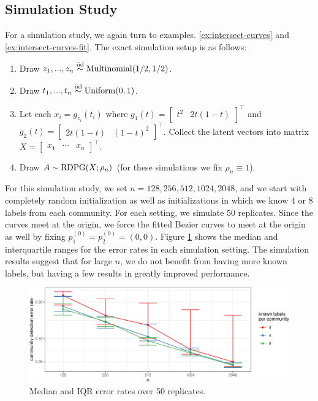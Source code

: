 \documentclass[
  11pt,
]{article}
\providecommand{\tightlist}{%
  \setlength{\itemsep}{0pt}\setlength{\parskip}{0pt}}
\theoremstyle{definition}
\theoremstyle{definition}
\theoremstyle{definition}
\theoremstyle{definition}
\theoremstyle{remark}
\begin{document}
\hypertarget{simulation-study-1}{%
\subsection{Simulation Study}\label{simulation-study-1}}

For a simulation study, we again turn to examples. \ref{ex:intersect-curves} and \ref{ex:intersect-curves-fit}.
The exact simulation setup is as follows:

\begin{enumerate}
\def\labelenumi{\arabic{enumi}.}
\tightlist
\item
  Draw \(z_1, ..., z_n \stackrel{\mathrm{iid}}{\sim} \mathrm{Multinomial}(1/2, 1/2)\).
\item
  Draw \(t_1, ..., t_n \stackrel{\mathrm{iid}}{\sim} \mathrm{Uniform}(0, 1)\).
\item
  Let each \(x_i = g_{z_i}(t_i)\) where \(g_1(t) = \begin{bmatrix} t^2 & 2 t (1-t) \end{bmatrix}^\top\) and \(g_2(t) = \begin{bmatrix} 2 t (1-t) & (1-t)^2 \end{bmatrix}^\top\).
  Collect the latent vectors into matrix \(X = \begin{bmatrix} x_1 & \cdots & x_n \end{bmatrix}^\top\).
\item
  Draw \(A \sim \mathrm{RDPG}(X; \rho_n)\) (for these simulations we fix \(\rho_n \equiv 1\)).
\end{enumerate}

For this simulation study, we set \(n = 128, 256, 512, 1024, 2048\), and we start with completely random initialization as well as initializations in which we know 4 or 8 labels from each community.
For each setting, we simulate 50 replicates.
Since the curves meet at the origin, we force the fitted Bezier curves to meet at the origin as well by fixing \(p_1^{(0)} = p_2^{(0)} = (0, 0)\).
Figure \ref{fig:sim-curves} shows the median and interquartile ranges for the error rates in each simulation setting.
The simulation results suggest that for large \(n\), we do not benefit from having more known labels, but having a few results in greatly improved performance.

\begin{figure}[H]

{\centering \includegraphics{draft_files/figure-latex/sim-curves-1} 

}

\caption{Median and IQR error rates over 50 replicates.}\label{fig:sim-curves}
\end{figure}
\end{document}
